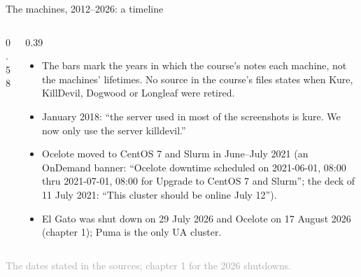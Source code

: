 \documentclass[aspectratio=169,11pt]{beamer}
\newcommand{\sourcecredit}[1]{\vfill\begin{flushright}\tiny\textcolor{DarkGray}{#1}\end{flushright}}
\begin{document}
\begin{frame}{The machines, 2012--2026: a timeline}
\label{fr:timeline}
\begin{columns}[T,onlytextwidth]
\begin{column}{0.58\textwidth}
\centering
{}
\end{column}
\begin{column}{0.39\textwidth}
\scriptsize
\begin{itemize}\setlength{\itemsep}{2pt}
  \item The bars mark the years in which the course's notes  each machine, not the machines' lifetimes. No source in the course's files states when Kure, KillDevil, Dogwood or Longleaf were retired.
  \item January 2018: ``the server used in most of the screenshots is kure. We now only use the server killdevil.''
  \item Ocelote moved to CentOS 7 and Slurm in June--July 2021 (an OnDemand banner: ``Ocelote downtime scheduled on 2021-06-01, 08:00 thru 2021-07-01, 08:00 for Upgrade to CentOS 7 and Slurm''; the deck of 11 July 2021: ``This cluster should be online July 12'').
  \item El Gato was shut down on 29 July 2026 and Ocelote on 17 August 2026 (chapter 1); Puma is the only UA cluster.
\end{itemize}
\end{column}
\end{columns}
\sourcecredit{The dates stated in the sources; chapter 1 for the 2026 shutdowns.}
\end{frame}
\end{document}
